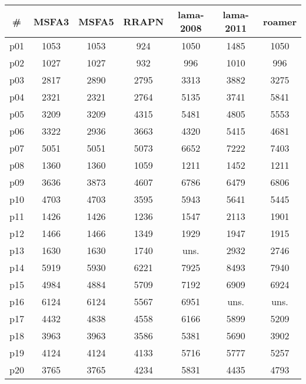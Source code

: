 \begin{tabular}{ccccccc}
\toprule
\textbf{\#} & \textbf{MSFA3} & \textbf{MSFA5} & \textbf{RRAPN} & \textbf{lama-2008} & \textbf{lama-2011} & \textbf{roamer}\\
\midrule
p01 & 1053 & 1053 & 924 & 1050 & 1485 & 1050\\
p02 & 1027 & 1027 & 932 & 996 & 1010 & 996\\
p03 & 2817 & 2890 & 2795 & 3313 & 3882 & 3275\\
p04 & 2321 & 2321 & 2764 & 5135 & 3741 & 5841\\
p05 & 3209 & 3209 & 4315 & 5481 & 4805 & 5553\\
p06 & 3322 & 2936 & 3663 & 4320 & 5415 & 4681\\
p07 & 5051 & 5051 & 5073 & 6652 & 7222 & 7403\\
p08 & 1360 & 1360 & 1059 & 1211 & 1452 & 1211\\
p09 & 3636 & 3873 & 4607 & 6786 & 6479 & 6806\\
p10 & 4703 & 4703 & 3595 & 5943 & 5641 & 5445\\
p11 & 1426 & 1426 & 1236 & 1547 & 2113 & 1901\\
p12 & 1466 & 1466 & 1349 & 1929 & 1947 & 1915\\
p13 & 1630 & 1630 & 1740 & uns. & 2932 & 2746\\
p14 & 5919 & 5930 & 6221 & 7925 & 8493 & 7940\\
p15 & 4984 & 4884 & 5709 & 7192 & 6909 & 6924\\
p16 & 6124 & 6124 & 5567 & 6951 & uns. & uns.\\
p17 & 4432 & 4838 & 4558 & 6166 & 5899 & 5209\\
p18 & 3963 & 3963 & 3586 & 5381 & 5690 & 3902\\
p19 & 4124 & 4124 & 4133 & 5716 & 5777 & 5257\\
p20 & 3765 & 3765 & 4234 & 5831 & 4435 & 4793\\
\bottomrule
\end{tabular}

